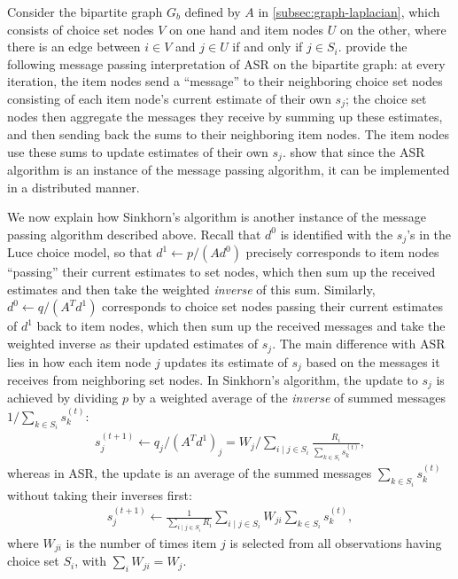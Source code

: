 Consider the bipartite graph $G_b$ defined by $A$ in \cref{subsec:graph-laplacian}, which consists of choice set nodes $V$ on one hand and item nodes $U$ on the other, where there is an edge between $i\in V$ and $j\in U$ if and only if $j\in S_i$. \citet{agarwal2018accelerated} provide the following message passing interpretation of ASR on the bipartite graph: at every iteration, the item nodes send a ``message'' to their
neighboring choice set nodes consisting of each item node's current estimate of their own $s_j$; the choice set nodes then aggregate the messages they receive by summing up these estimates, and then sending back the sums to their neighboring item nodes. The item nodes use these sums to update estimates of their own $s_j$. \citet{agarwal2018accelerated} show that since the ASR algorithm is an instance of the message passing algorithm, it can be implemented in a distributed manner.%

We now explain how Sinkhorn's algorithm is another instance of the message passing algorithm described above. Recall that $d^0$ is identified with the $s_j$'s in the Luce choice model, so that $d^{1} \leftarrow p/(Ad^{0})$ precisely corresponds to item nodes ``passing'' their current estimates to set nodes, which then sum up the received estimates and then take the weighted \emph{inverse} of this sum. Similarly, $d^0 \leftarrow q/(A^{T} d^{1})$ corresponds to choice set nodes passing their current estimates of $d^1$ back to item nodes, which then sum up the received messages and take the weighted inverse as their updated estimates of $s_j$. The main difference with ASR lies in how each item node $j$ updates its estimate of $s_j$ based on the messages it receives from neighboring set nodes. In Sinkhorn's algorithm, the update to $s_j$ is achieved by dividing $p$ by a weighted average of the \emph{inverse} of summed messages $1/\sum_{k\in S_{i}}s_{k}^{(t)}$:
\begin{align*}
  s_j^{(t+1)} \leftarrow  q_j/(A^{T} d^{1})_j=W_j/\sum_{i\mid j\in S_{i}}\frac{R_i}{\sum_{k\in S_{i}}s_{k}^{(t)}},
\end{align*}
whereas in ASR, the update is an average of the summed messages $\sum_{k\in S_{i}}s_{k}^{(t)}$ without taking their inverses first: 
\begin{align*}
    s^{(t+1)}_j \leftarrow  \frac{1}{\sum_{i\mid j\in S_{i}} R_i} \sum_{i\mid j \in S_i}  W_{ji} \sum_{k\in S_{i}}s_{k}^{(t)},
\end{align*}
where $W_{ji}$ is the number of times item $j$ is selected from all observations having choice set $S_i$, with $\sum_i W_{ji} = W_j$.

